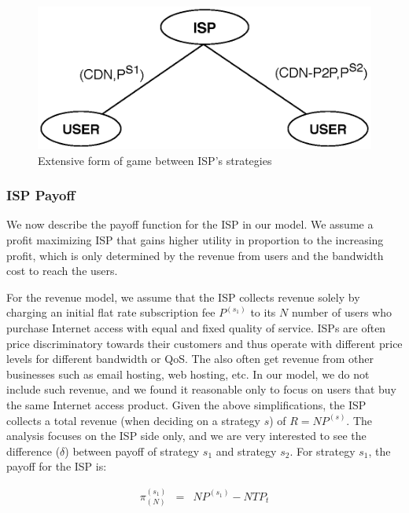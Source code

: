 \documentclass[paper]{ieice}
\begin{document}
\begin{figure}[tb] 
\begin{center}
\includegraphics[scale=0.5]{graphs/game-tree-2.eps}
\end{center}
\caption{Extensive form of game between ISP's strategies}
\label{fig:gametree}
\vspace{-2mm}
\end{figure}

\subsubsection{ISP Payoff}

We now describe the payoff function for the ISP in our model. 
We assume a profit maximizing ISP that gains higher utility in proportion to the increasing profit, which is only determined by the revenue from users and the bandwidth cost to reach the users.

For the revenue model, we assume that the ISP collects revenue solely by charging an initial flat rate subscription fee $P^{(s_1)}$ to its $N$ number of users who purchase Internet access with equal and fixed quality of service.  
ISPs are often price discriminatory towards their customers and thus operate with different price levels for different bandwidth or QoS.  
The also often get revenue from other businesses such as email hosting, web hosting, etc.  
In our model, we do not include such revenue, and we found it reasonable only to focus on users that buy the same Internet access product.  
Given the above simplifications, the ISP collects a total revenue (when deciding on a
strategy $s$) of $R = N P^{(s)}$.  
The analysis focuses on the ISP side only, and we are very interested to see the difference ($\delta$) between payoff of strategy $s_1$ and strategy $s_2$.  
For strategy $s_1$, the payoff for the ISP is:

\begin{eqnarray}
	\pi^{(s_1)}_{(N)}&=& N P^{(s_1)} - N T P_t\\
\end{eqnarray}
\end{document}
